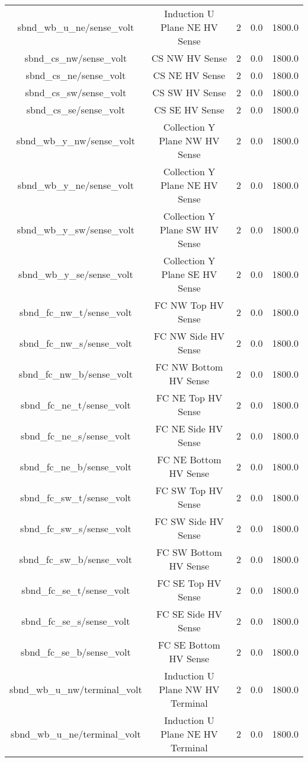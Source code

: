 \begin{center}
\begin{longtable}{c | c c c c }
sbnd\_wb\_u\_ne/sense\_volt & Induction U Plane NE HV Sense & 2 & 0.0 & 1800.0\\ 
sbnd\_cs\_nw/sense\_volt & CS NW HV Sense & 2 & 0.0 & 1800.0\\ 
sbnd\_cs\_ne/sense\_volt & CS NE HV Sense & 2 & 0.0 & 1800.0\\ 
sbnd\_cs\_sw/sense\_volt & CS SW HV Sense & 2 & 0.0 & 1800.0\\ 
sbnd\_cs\_se/sense\_volt & CS SE HV Sense & 2 & 0.0 & 1800.0\\ 
sbnd\_wb\_y\_nw/sense\_volt & Collection Y Plane NW HV Sense & 2 & 0.0 & 1800.0\\ 
sbnd\_wb\_y\_ne/sense\_volt & Collection Y Plane NE HV Sense & 2 & 0.0 & 1800.0\\ 
sbnd\_wb\_y\_sw/sense\_volt & Collection Y Plane SW HV Sense & 2 & 0.0 & 1800.0\\ 
sbnd\_wb\_y\_se/sense\_volt & Collection Y Plane SE HV Sense & 2 & 0.0 & 1800.0\\ 
sbnd\_fc\_nw\_t/sense\_volt & FC NW Top HV Sense & 2 & 0.0 & 1800.0\\ 
sbnd\_fc\_nw\_s/sense\_volt & FC NW Side HV Sense & 2 & 0.0 & 1800.0\\ 
sbnd\_fc\_nw\_b/sense\_volt & FC NW Bottom HV Sense & 2 & 0.0 & 1800.0\\ 
sbnd\_fc\_ne\_t/sense\_volt & FC NE Top HV Sense & 2 & 0.0 & 1800.0\\ 
sbnd\_fc\_ne\_s/sense\_volt & FC NE Side HV Sense & 2 & 0.0 & 1800.0\\ 
sbnd\_fc\_ne\_b/sense\_volt & FC NE Bottom HV Sense & 2 & 0.0 & 1800.0\\ 
sbnd\_fc\_sw\_t/sense\_volt & FC SW Top HV Sense & 2 & 0.0 & 1800.0\\ 
sbnd\_fc\_sw\_s/sense\_volt & FC SW Side HV Sense & 2 & 0.0 & 1800.0\\ 
sbnd\_fc\_sw\_b/sense\_volt & FC SW Bottom HV Sense & 2 & 0.0 & 1800.0\\ 
sbnd\_fc\_se\_t/sense\_volt & FC SE Top HV Sense & 2 & 0.0 & 1800.0\\ 
sbnd\_fc\_se\_s/sense\_volt & FC SE Side HV Sense & 2 & 0.0 & 1800.0\\ 
sbnd\_fc\_se\_b/sense\_volt & FC SE Bottom HV Sense & 2 & 0.0 & 1800.0\\ 
sbnd\_wb\_u\_nw/terminal\_volt & Induction U Plane NW HV Terminal & 2 & 0.0 & 1800.0\\ 
sbnd\_wb\_u\_ne/terminal\_volt & Induction U Plane NE HV Terminal & 2 & 0.0 & 1800.0\\ 

\end{longtable}
\end{center}
